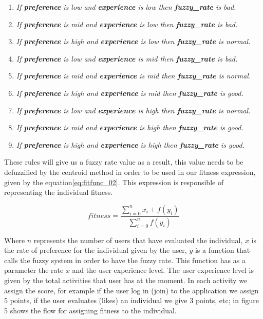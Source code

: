 \begin{enumerate}
	\item \textit{If \textbf{preference} is low and
		\textbf{experience} is low then \textbf{fuzzy\_rate} is bad.}
	\item \textit{If \textbf{preference} is mid and
		\textbf{experience} is low  then \textbf{fuzzy\_rate} is bad.}
	\item \textit{If \textbf{preference} is high and
		\textbf{experience} is low  then \textbf{fuzzy\_rate} is normal.}
	\item \textit{If \textbf{preference} is low and
		\textbf{experience} is mid then \textbf{fuzzy\_rate} is bad.}
	\item \textit{If \textbf{preference} is mid and
		\textbf{experience} is mid  then \textbf{fuzzy\_rate} is normal.}
	\item \textit{If \textbf{preference} is high and
		\textbf{experience} is mid  then \textbf{fuzzy\_rate} is good.}
	\item \textit{If \textbf{preference} is low and
		\textbf{experience} is high then \textbf{fuzzy\_rate} is normal.}
	\item \textit{If \textbf{preference} is mid and
		\textbf{experience} is high  then \textbf{fuzzy\_rate} is good.}
	\item \textit{If \textbf{preference} is high and
		\textbf{experience} is high  then \textbf{fuzzy\_rate} is good.}

\end{enumerate}

These rules will give us a fuzzy rate value as a result, this value needs to
be defuzzified by the centroid method in order to be used in our fitness
expression, given by the equation\ref{eq:fitfunc_02}. This expression is responsible
of representing the individual fitness.

\begin{equation}\label{eq:fitfunc_02}
\displaystyle fitness=\frac{\sum_{i=0}^{n}x_{i}+f(y_{i})}{\sum_{i=0}^{n}f(y_{i})}
\end{equation}

Where $n$ represents  the number of  users that have evaluated the
individual, $x$ is the rate of preference for the  individual  given by the user,
$y$ is a function that calls the fuzzy system in order to have the fuzzy rate.
This function has as a parameter the rate $x$ and the user experience level.
The user experience level
is given  by the  total activities that user has at the moment. In each
activity we assign the score, for example if the user log in (join) to the
application we assign 5 points, if the user evaluates (likes) an individual we
give 3 points, etc; in figure 5 shows the flow for assigning fitness to
the individual.


